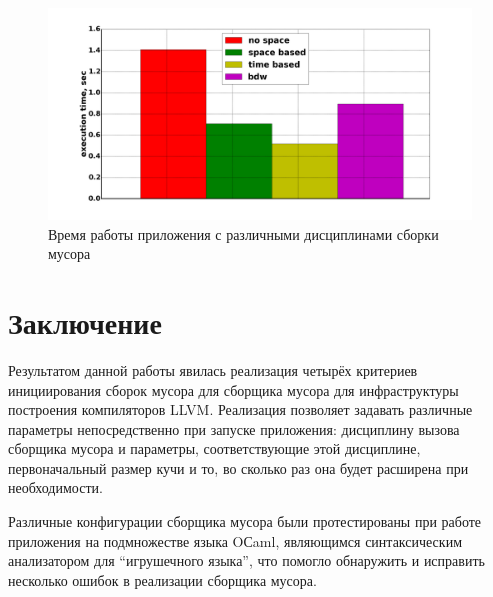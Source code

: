 \begin{figure}[ph]
\caption{\label{pic:perf}Время работы приложения с различными дисциплинами сборки мусора}
\includegraphics[width=1\linewidth]{Bakradze/perf.png}
\end{figure}

\section*{Заключение}
Результатом данной работы явилась реализация
четырёх критериев инициирования сборок мусора для сборщика мусора для инфраструктуры
построения компиляторов LLVM.
Реализация позволяет задавать различные параметры непосредственно при запуске
приложения: дисциплину вызова сборщика мусора и параметры, соответствующие этой
дисциплине, первоначальный размер кучи и то, во сколько раз она будет расширена при необходимости.

Различные конфигурации сборщика мусора были протестированы при работе приложения на
подмножестве языка OСaml, являющимся синтаксическим анализатором для ``игрушечного языка'',
что помогло обнаружить и исправить несколько ошибок в реализации сборщика мусора.

